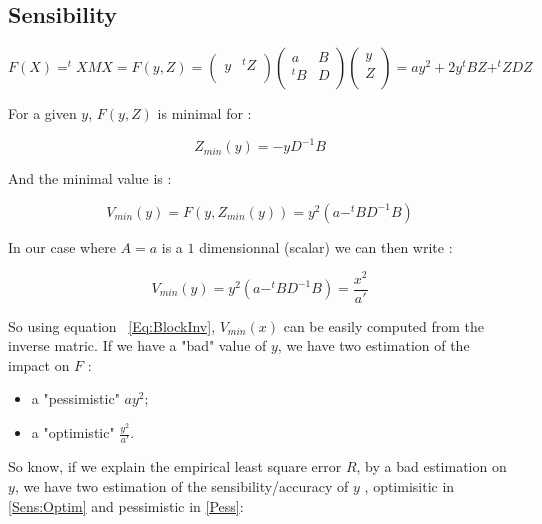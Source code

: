 \subsection{Sensibility}


\begin{equation}
F(X) = ^t X M X = F(y,Z)= 
\left( \begin{array}{cc} 
              y &  ^t Z \\ 
        \end{array} 
\right)
\left( \begin{array}{cc} 
              a & B \\ 
              ^t B  & D\\ 
        \end{array} 
\right)
\left( \begin{array}{c} 
              y \\ 
              Z \\ 
        \end{array} 
\right)
= a y^2 + 2y^t B Z + ^t Z D Z
\label{EqSensib1}
\end{equation}

For a given $y$, $F(y,Z)$ is minimal for :

\begin{equation}
Z_{min}(y) = -y  D^{-1} B
\end{equation}

And the minimal value is :

\begin{equation}
V_{min}(y) = F(y,Z_{min}(y)) =  y^2 (a- ^t B D^{-1} B)
\end{equation}


In our  case where $A=a$ is a $1$ dimensionnal (scalar) we can then write :

\begin{equation}
V_{min}(y) =   y^2 (a- ^t B D^{-1} B) = \frac{x^2}{a'}
\end{equation}

So using equation ~\ref{Eq:BlockInv}, $V_{min}(x)$ can be easily computed  from the inverse matric. If
we have a "bad" value of $y$, we have two estimation of the impact
on  $F$ :

\begin{itemize}
   \item a "pessimistic" $a y^2$;
   \item a "optimistic" $\frac{y^2}{a'}$.
\end{itemize}

So know, if we explain the empirical least square error $R$, by
a bad estimation on $y$, we have two estimation of the sensibility/accuracy of $y$ ,
optimisitic in \ref{Sens:Optim} and pessimistic in \ref{Pess}:

